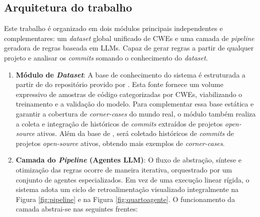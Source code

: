 \documentclass[
    12pt,                %
    openright,           %
    oneside,             %
    a4paper,             %
    english,             %
    brazil               %
]{abntex2}
\begin{document}
\subsection{Arquitetura do trabalho}
\label{sec:arquitetura}
\par
Este trabalho é organizado em dois módulos principais independentes e complementares: um \textit{dataset} global unificado de CWEs e uma camada de \textit{pipeline} geradora de regras baseada em LLMs.
Capaz de gerar regras a partir de qualquer projeto e analisar os \textit{commits} somando o conhecimento do \textit{dataset}.
\begin{enumerate}
  \item \textbf{Módulo de \textit{Dataset}}:
    A base de conhecimento do sistema é estruturada a partir de do repositório provido por .
Esta fonte fornece um volume expressivo de amostras de código categorizadas por CWEs, viabilizando o treinamento e a validação do modelo.
Para complementar essa base estática e garantir a cobertura de \textit{corner-cases} do mundo real, o módulo também realiza a coleta e integração de históricos de \textit{commits} extraídos de projetos \textit{open-source} ativos.
Além da base de , será coletado históricos de \textit{commits} de projetos \textit{open-source} ativos, obtendo mais exemplos de \textit{corner-cases}.
\item \textbf{Camada do \textit{Pipeline} (Agentes LLM)}: 
  O fluxo de abstração, síntese e otimização das regras ocorre de maneira iterativa, orquestrado por um conjunto de agentes especializados.
  Em vez de uma execução linear rígida, o sistema adota um ciclo de retroalimentação visualizado integralmente na Figura \ref{fig:pipeline} e na Figura \ref{fig:quartoagente}.
  O funcionamento da camada abstrai-se nas seguintes frentes:


\end{enumerate}
\end{document}
